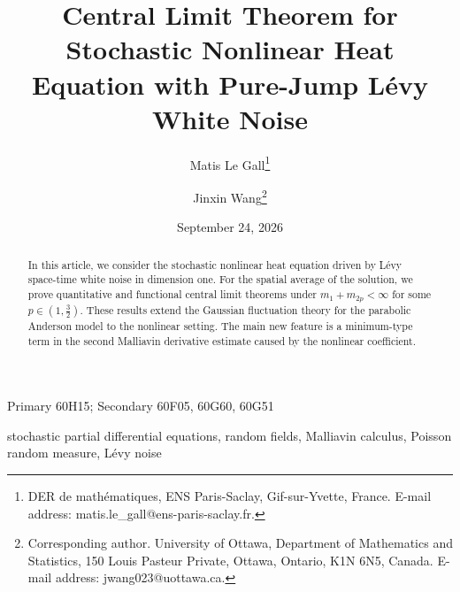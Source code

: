 \documentclass[12pt]{article}
\begin{document}
\title{Central Limit Theorem for Stochastic Nonlinear Heat Equation with Pure-Jump Lévy White Noise }

\author{ Matis Le Gall\footnote{DER de mathématiques, ENS Paris-Saclay, Gif-sur-Yvette, France. E-mail address: matis.le\_gall@ens-paris-saclay.fr.  } \and   Jinxin Wang\footnote{Corresponding author. University of Ottawa, Department of Mathematics and Statistics, 150 Louis Pasteur Private, Ottawa, Ontario, K1N 6N5, Canada. E-mail address: jwang023@uottawa.ca.}}

\date{September 24, 2026}
\maketitle

\begin{abstract}
\noindent
In this article, we consider the stochastic nonlinear heat equation driven by
L\'evy space-time white noise in dimension one. For the spatial average of the
solution, we prove quantitative and functional central limit theorems under
 $m_1+m_{2p}<\infty$ for some $p\in(1,\frac32)$. These results extend the Gaussian fluctuation theory for the
parabolic Anderson model to the nonlinear setting. The main new feature is a
minimum-type term in the second Malliavin derivative estimate caused by the
nonlinear coefficient.
\end{abstract}



 Primary 60H15; Secondary 60F05, 60G60, 60G51

\vspace{1mm}

 stochastic partial differential equations, random fields, Malliavin calculus, Poisson random measure, L\'evy noise




%
%
%
\end{document}
